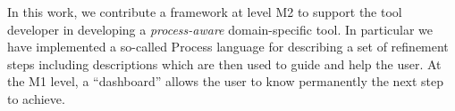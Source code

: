 In this work, we contribute a framework at level M2 to support the tool developer
in developing a \emph{process-aware} domain-specific tool.
In particular we have implemented a so-called \textsf{Process} language for
describing a set of refinement steps including descriptions which are then used to guide and help the user.
At the M1 level, a ``dashboard'' allows the user to know permanently the next step to achieve.



